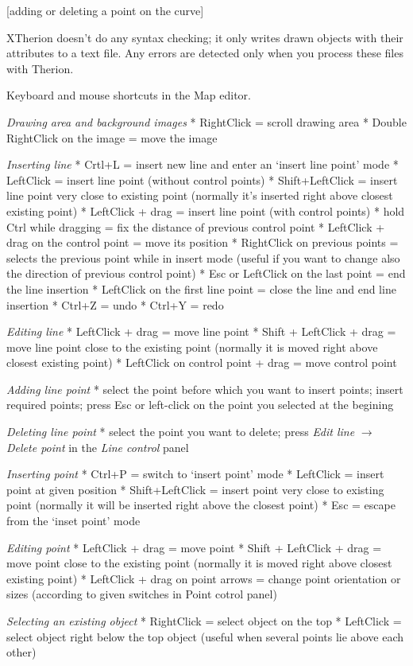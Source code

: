 [adding or deleting a point on the curve]

XTherion doesn't do any syntax checking; it only writes drawn objects with their 
attributes to a text file. Any errors are detected only when you process these 
files with Therion.


\subsubchapter Keyboard and mouse shortcuts in the Map editor.

{\it Drawing area and background images}
\list
 * RightClick = scroll drawing area
 * Double RightClick on the image = move the image
\endlist

{\it Inserting line}
\list
 * Crtl+L = insert new line and enter an `insert line point' mode
 * LeftClick = insert line point (without control points)
 * Shift+LeftClick = insert line point very close to existing point 
    (normally it's inserted right above closest existing point)
 * LeftClick + drag = insert line point (with control points)
 * hold Ctrl while dragging = fix the distance of previous control point
 * LeftClick + drag on the control point = move its position
 * RightClick on previous points = selects the previous point while in
    insert mode (useful if you want to change also the direction of
    previous control point)
 * Esc or LeftClick on the last point = end the line insertion
 * LeftClick on the first line point = close the line and end line insertion
 * Ctrl+Z = undo
 * Ctrl+Y = redo
\endlist

{\it Editing line}
\list
 * LeftClick + drag = move line point
 * Shift + LeftClick + drag = move line point close to the existing
    point (normally it is moved right above closest existing point)
 * LeftClick on control point + drag = move control point
\endlist

{\it Adding line point}
\list
  * select the point before which you want to insert points;
    insert required points;
    press Esc or left-click on the point you selected at the begining
\endlist
  
{\it Deleting line point}
\list
  * select the point you want to delete;
    press {\it Edit line} $\to$ {\it Delete point} in the {\it Line control} 
    panel
\endlist

{\it Inserting point}
\list
 * Ctrl+P = switch to `insert point' mode
 * LeftClick = insert point at given position
 * Shift+LeftClick = insert point very close to existing point (normally it
    will be inserted right above the closest point)
 * Esc = escape from the `inset point' mode
\endlist

{\it Editing point}
\list
 * LeftClick + drag = move point
 * Shift + LeftClick + drag = move point close to the existing
    point (normally it is moved right above closest existing point)
 * LeftClick + drag on point arrows = change point orientation or
    sizes (according to given switches in Point cotrol panel)
\endlist

{\it Selecting an existing object}
\list
 * RightClick = select object on the top
 * LeftClick = select object right below the top object (useful when several
    points lie above each other)
\endlist




\endinput
